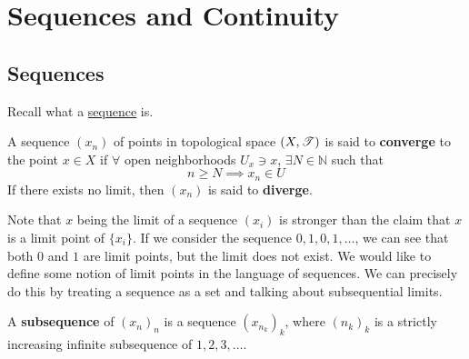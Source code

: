 \section{Sequences and Continuity} 

\subsection{Sequences} 

  Recall what a \hyperref[st-def:sequence]{sequence} is. 

  \begin{definition}
    \label{def:sequence}
    A sequence $(x_n)$ of points in topological space $(X, \operatorname{\mathscr{T}})$ is said to \textbf{converge} to the point $x \in X$ if $\forall$ open neighborhoods $U_x \ni x$, $\exists N \in \mathbb{N}$ such that
    \begin{equation}
      n \geq N \implies x_n \in U 
    \end{equation}
    If there exists no limit, then $(x_n)$ is said to \textbf{diverge}. 
  \end{definition}

  Note that $x$ being the limit of a sequence $(x_i)$ is stronger than the claim that $x$ is a limit point of $\{x_i\}$. If we consider the sequence $0, 1, 0, 1, \ldots$, we can see that both $0$ and $1$ are limit points, but the limit does not exist. We would like to define some notion of limit points in the language of sequences. We can precisely do this by treating a sequence as a set and talking about subsequential limits. 

  \begin{definition}[Subsequences]
    A \textbf{subsequence} of $(x_n)_n$ is a sequence $(x_{n_k})_k$, where $(n_k)_k$ is a strictly increasing infinite subsequence of $1, 2, 3, \ldots$. 
  \end{definition}


